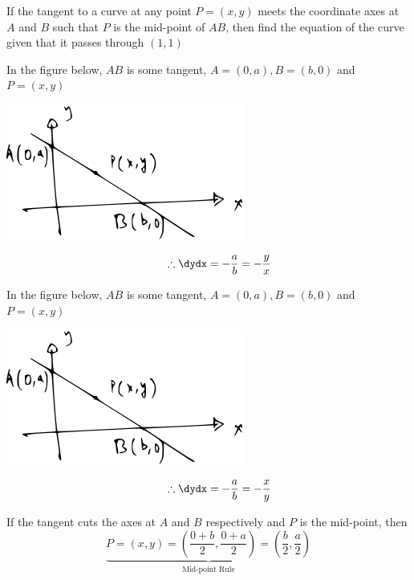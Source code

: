 \documentclass[14pt,fleqn]{extarticle}
\begin{document}
 
\begin{problem}
	\statement 
    
    If the tangent to a curve at any point $P = (x,y)$ meets the coordinate
    axes at $A$ and $B$ such that $P$ is the mid-point of $AB$, then find the equation 
    of the curve given that it passes through $(1,1)$
    
    \begin{step}
  \begin{options} 
     \correct 
       
       In the figure below, $AB$ is some tangent, $A = (0,a), B = (b,0)$ and $P=(x,y)$ 
       
       \begin{center}
\includegraphics[scale=1.4]{1417-A.svg}
\end{center}

     \[\qquad \therefore \dydx = -\frac{a}{b} = -\frac{y}{x} \]
       
     \incorrect
     
     In the figure below, $AB$ is some tangent, $A = (0,a), B = (b,0)$ and $P=(x,y)$ 
       
       \begin{center}
\includegraphics[scale=1.4]{1417-A.svg}
\end{center}

     \[\qquad \therefore \dydx = -\frac{a}{b} = -\frac{x}{y} \]
        
    \end{options} 
     \reason 
     
     If the tangent cuts the axes at $A$ and $B$ respectively and $P$ 
     is the mid-point, then 
     \[ \underbrace{P = \left(x,y \right) = \left(\frac{0+b}{2},\frac{0+a}{2} \right) = \left(\frac{b}{2}, \frac{a}{2} \right)}_{\text{Mid-point Rule}} \]
       

\end{step}
\end{problem}
\end{document}
